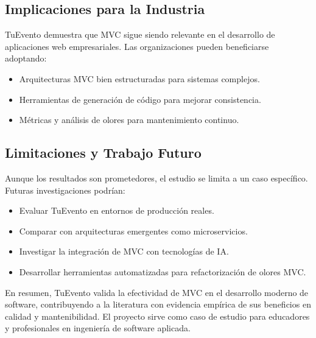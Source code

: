\subsection{Implicaciones para la Industria}
TuEvento demuestra que MVC sigue siendo relevante en el desarrollo de aplicaciones web empresariales. Las organizaciones pueden beneficiarse adoptando:
\begin{itemize}
\item Arquitecturas MVC bien estructuradas para sistemas complejos.
\item Herramientas de generación de código para mejorar consistencia.
\item Métricas y análisis de olores para mantenimiento continuo.
\end{itemize}

\subsection{Limitaciones y Trabajo Futuro}
Aunque los resultados son prometedores, el estudio se limita a un caso específico. Futuras investigaciones podrían:
\begin{itemize}
\item Evaluar TuEvento en entornos de producción reales.
\item Comparar con arquitecturas emergentes como microservicios.
\item Investigar la integración de MVC con tecnologías de IA.
\item Desarrollar herramientas automatizadas para refactorización de olores MVC.
\end{itemize}

En resumen, TuEvento valida la efectividad de MVC en el desarrollo moderno de software, contribuyendo a la literatura con evidencia empírica de sus beneficios en calidad y mantenibilidad. El proyecto sirve como caso de estudio para educadores y profesionales en ingeniería de software aplicada.